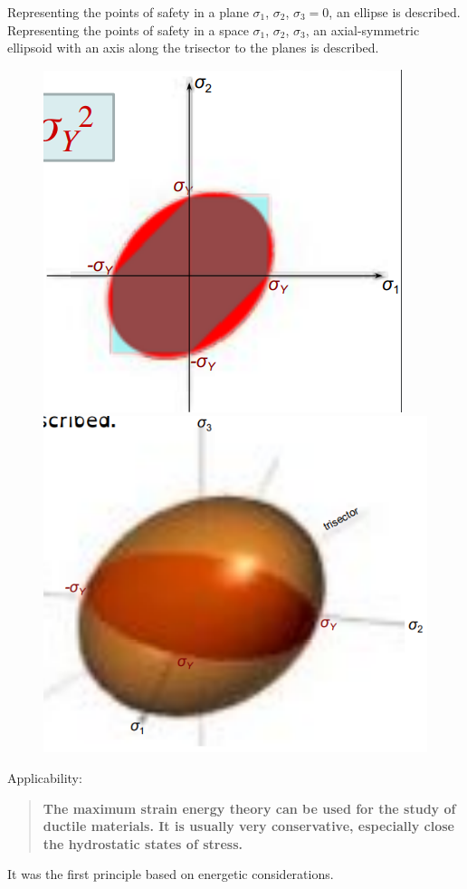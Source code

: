 \documentclass[class=report, crop=false, 12pt,a4paper]{standalone}
\begin{document}
Representing the points of safety in a plane $\sigma_1$, $\sigma_2$, $\sigma_3 = 0$, an ellipse is described. Representing the points of safety in a space $\sigma_1$, $\sigma_2$, $\sigma_3$, an axial-symmetric ellipsoid with an axis along the trisector to the planes is described.
\begin{figure}
  \begin{center}
    \begin{minipage}[b]{0.46\textwidth}
      \centering
      \includegraphics[width = \textwidth]{../img/diagram92.png}
      \caption{}
    \end{minipage}
    \begin{minipage}[b]{0.46\textwidth}
      \centering
      \includegraphics[width = \textwidth]{../img/diagram93.png}
      \caption{}
    \end{minipage}
  \end{center}
\end{figure}
Applicability:
\begin{quotation}
  \textbf{The maximum strain energy theory can be used for the study of ductile materials. It is usually very conservative, especially close the hydrostatic states of stress.}
\end{quotation}
It was the first principle based on energetic considerations.
\end{document}
